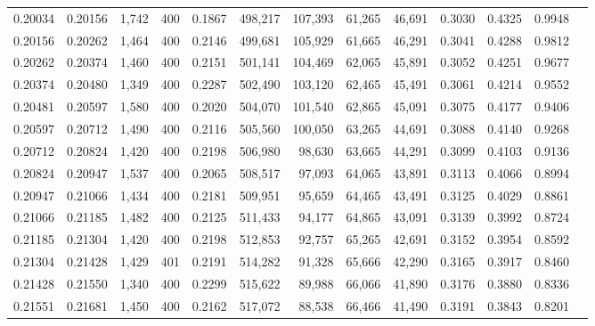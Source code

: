 \begin{tabular}{rrrrrrrrrrrrr}
0.20034 & 0.20156 &  1,742 & 400 &                                     0.1867 & 498,217 & 107,393 &  61,265 &  46,691 & 0.3030 & 0.4325 & 0.9948 \\
0.20156 & 0.20262 &  1,464 & 400 &                                     0.2146 & 499,681 & 105,929 &  61,665 &  46,291 & 0.3041 & 0.4288 & 0.9812 \\
0.20262 & 0.20374 &  1,460 & 400 &                                     0.2151 & 501,141 & 104,469 &  62,065 &  45,891 & 0.3052 & 0.4251 & 0.9677 \\
0.20374 & 0.20480 &  1,349 & 400 &                                     0.2287 & 502,490 & 103,120 &  62,465 &  45,491 & 0.3061 & 0.4214 & 0.9552 \\
0.20481 & 0.20597 &  1,580 & 400 &                                     0.2020 & 504,070 & 101,540 &  62,865 &  45,091 & 0.3075 & 0.4177 & 0.9406 \\
0.20597 & 0.20712 &  1,490 & 400 &                                     0.2116 & 505,560 & 100,050 &  63,265 &  44,691 & 0.3088 & 0.4140 & 0.9268 \\
0.20712 & 0.20824 &  1,420 & 400 &                                     0.2198 & 506,980 &  98,630 &  63,665 &  44,291 & 0.3099 & 0.4103 & 0.9136 \\
0.20824 & 0.20947 &  1,537 & 400 &                                     0.2065 & 508,517 &  97,093 &  64,065 &  43,891 & 0.3113 & 0.4066 & 0.8994 \\
0.20947 & 0.21066 &  1,434 & 400 &                                     0.2181 & 509,951 &  95,659 &  64,465 &  43,491 & 0.3125 & 0.4029 & 0.8861 \\
0.21066 & 0.21185 &  1,482 & 400 &                                     0.2125 & 511,433 &  94,177 &  64,865 &  43,091 & 0.3139 & 0.3992 & 0.8724 \\
0.21185 & 0.21304 &  1,420 & 400 &                                     0.2198 & 512,853 &  92,757 &  65,265 &  42,691 & 0.3152 & 0.3954 & 0.8592 \\
0.21304 & 0.21428 &  1,429 & 401 &                                     0.2191 & 514,282 &  91,328 &  65,666 &  42,290 & 0.3165 & 0.3917 & 0.8460 \\
0.21428 & 0.21550 &  1,340 & 400 &                                     0.2299 & 515,622 &  89,988 &  66,066 &  41,890 & 0.3176 & 0.3880 & 0.8336 \\
0.21551 & 0.21681 &  1,450 & 400 &                                     0.2162 & 517,072 &  88,538 &  66,466 &  41,490 & 0.3191 & 0.3843 & 0.8201 \\

\end{tabular}
